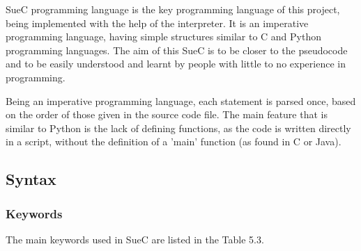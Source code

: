 \documentclass[12pt,a4paper,twoside]{report}
\begin{document}
SueC programming language is the key programming language of this project, being implemented with the help of the interpreter. It is an imperative programming language, having simple structures similar to C and Python programming languages. The aim of this SueC is to be closer to the pseudocode and to be easily understood and learnt by people with little to no experience in programming.

Being an imperative programming language, each statement is parsed once, based on the order of those given in the source code file. The main feature that is similar to Python is the lack of defining functions, as the code is written directly in a script, without the definition of a 'main' function (as found in C or Java). 

\subsection{Syntax}

\subsubsection{Keywords}
	The main keywords used in SueC are listed in the Table 5.3.
	
\end{document}
